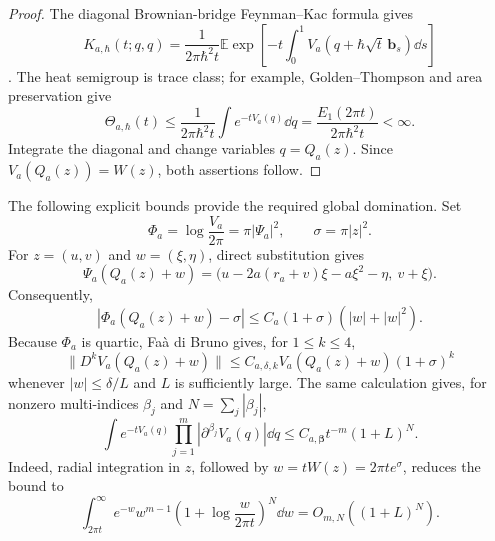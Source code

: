 \begin{proof}
The diagonal Brownian-bridge Feynman--Kac formula gives
\begin{equation}
 K_{a,\hbar}(t;q,q)=\frac1{2\pi\hbar^2t}
 \mathbb E\exp\!\left[-t\int_0^1
 V_a(q+\hbar\sqrt t\,\mathbf b_s)\dd s\right]
\end{equation}
\citep{Simon2005FunctionalIntegration,BoldtGueneysu2023}.  The heat
semigroup is trace class; for example, Golden--Thompson and area preservation
give
\begin{equation}
 \Theta_{a,\hbar}(t)
 \le\frac1{2\pi\hbar^2t}\int e^{-tV_a(q)}\dd q
 =\frac{E_1(2\pi t)}{2\pi\hbar^2t}<\infty.
 \label{eq:app-GT-heat-bound}
\end{equation}
Integrate the diagonal and change variables \(q=Q_a(z)\).  Since
\(V_a(Q_a(z))=W(z)\), both assertions follow.
\end{proof}

The following explicit bounds provide the required global domination.  Set
\begin{equation}
 \Phi_a=\log\frac{V_a}{2\pi}=\pi|\Psi_a|^2,
 \qquad \sigma=\pi|z|^2.
 \label{eq:app-heat-Phi-sigma}
\end{equation}
For \(z=(u,v)\) and \(w=(\xi,\eta)\), direct substitution gives
\begin{equation}
 \Psi_a(Q_a(z)+w)
 =\bigl(u-2a(r_a+v)\xi-a\xi^2-\eta,\ v+\xi\bigr).
 \label{eq:app-exact-henon-displacement}
\end{equation}
Consequently,
\begin{equation}
 |\Phi_a(Q_a(z)+w)-\sigma|
 \le C_a(1+\sigma)(|w|+|w|^2).
 \label{eq:app-Phi-displacement-bound}
\end{equation}
Because \(\Phi_a\) is quartic, Fa\`a di Bruno gives, for \(1\le k\le4\),
\begin{equation}
 \|D^kV_a(Q_a(z)+w)\|
 \le C_{a,\delta,k}V_a(Q_a(z)+w)(1+\sigma)^k
 \label{eq:app-normalized-heat-derivatives}
\end{equation}
whenever \(|w|\le\delta/L\) and \(L\) is sufficiently large.  The same
calculation gives, for nonzero multi-indices \(\beta_j\) and
\(N=\sum_j|\beta_j|\),
\begin{equation}
 \int e^{-tV_a(q)}\prod_{j=1}^m
 |\partial^{\beta_j}V_a(q)|\dd q
 \le C_{a,\boldsymbol\beta}t^{-m}(1+L)^N.
 \label{eq:app-weighted-heat-derivatives}
\end{equation}
Indeed, radial integration in \(z\), followed by
\(w=tW(z)=2\pi t e^\sigma\), reduces the bound to
\begin{equation}
 \int_{2\pi t}^{\infty}e^{-w}w^{m-1}
 \left(1+\log\frac{w}{2\pi t}\right)^N\dd w
 =O_{m,N}((1+L)^N).
 \label{eq:app-gamma-derivative-bound}
\end{equation}


